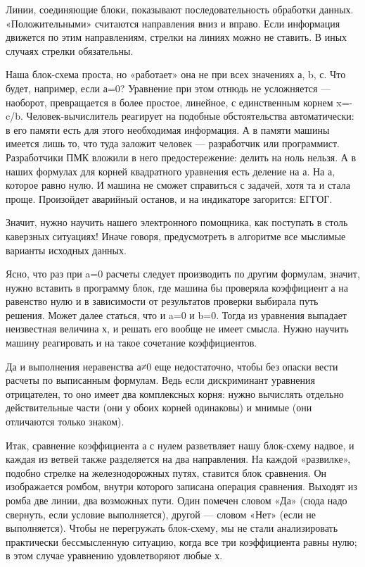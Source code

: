 \documentclass[11pt,a4paper,oneside]{article}
\begin{document}
Линии, соединяющие блоки, показывают последовательность обработки данных. «Положительными» считаются направления вниз и вправо. Если информация движется по этим направлениям, стрелки на линиях можно не ставить. В иных случаях стрелки обязательны.

Наша блок-схема проста, но «работает» она не при всех значениях а, b, с. Что будет, например, если а=0? Уравнение при этом отнюдь не усложняется — наоборот, превращается в более простое, линейное, с
единственным корнем x=-c/b. Человек-вычислитель реагирует на подобные обстоятельства автоматически:	в его памяти есть для этого необходимая информация. А в памяти машины имеется лишь то, что туда заложит человек — разработчик или программист. Разработчики ПМК вложили в него предостережение: делить на ноль нельзя. А в наших формулах для корней квадратного уравнения есть деление на а. На а, которое равно нулю. И машина не сможет справиться с задачей, хотя та и стала проще. Произойдет аварийный останов, и на индикаторе загорится: ЕГГОГ.

Значит, нужно научить нашего электронного помощника, как поступать в столь каверзных ситуациях! Иначе говоря, предусмотреть в алгоритме все мыслимые варианты исходных данных.

Ясно, что раз при a=0 расчеты следует производить по другим формулам, значит, нужно вставить в программу блок, где машина бы проверяла коэффициент а на равенство нулю и в зависимости от результатов проверки выбирала путь решения. Может далее статься, что и a=0 и b=0. Тогда из уравнения выпадает неизвестная величина х, и решать его вообще не имеет смысла. Нужно научить машину реагировать и на такое сочетание коэффициентов.

Да и выполнения неравенства а≠0 еще недостаточно, чтобы без опаски вести расчеты по выписанным формулам. Ведь если дискриминант уравнения отрицателен, то оно имеет два комплексных корня: нужно вычислять отдельно действительные части (они у обоих корней одинаковы) и мнимые (они отличаются только знаком).

Итак, сравнение коэффициента а с нулем разветвляет нашу блок-схему надвое, и каждая из ветвей также разделяется на два направления. На каждой «развилке», подобно стрелке на железнодорожных путях, ставится блок сравнения. Он изображается ромбом, внутри которого записана операция сравнения. Выходят из ромба две линии, два возможных пути. Один помечен словом «Да» (сюда надо свернуть, если условие выполняется), другой — словом «Нет» (если не выполняется). Чтобы не перегружать блок-схему, мы не стали анализировать практически бессмысленную ситуацию, когда все три коэффициента равны нулю; в этом случае уравнению удовлетворяют любые х.
\end{document}
